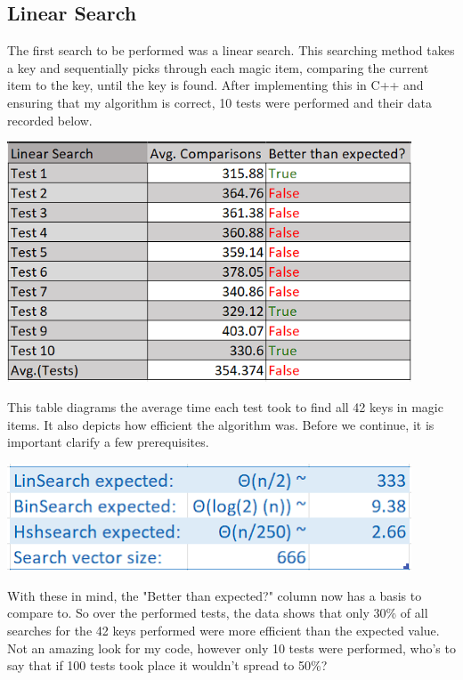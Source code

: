\documentclass[12pt, letterpaper]{article}
\begin{document}
\subsection{Linear Search} \label{LinSch}
The first search to be performed was a linear search.
This searching method takes a key and sequentially picks through each magic item, comparing the current item to the key, until the key is found.
After implementing this in C++ and ensuring that my algorithm is correct, 10 tests were performed and their data recorded below.
\begin{center}
   \includegraphics[width=120mm,scale=0.5]{LinSearch.png}
\end{center}
This table diagrams the average time each test took to find all 42 keys in magic items. 
It also depicts how efficient the algorithm was.
Before we continue, it is important clarify a few prerequisites.
\begin{center}
   \includegraphics[width=120mm,scale=0.5]{Prerequisites.png}
\end{center}
With these in mind, the "Better than expected?" column now has a basis to compare to.
So over the performed tests, the data shows that only 30\% of all searches for the 42 keys performed were more efficient than the expected value.
Not an amazing look for my code, however only 10 tests were performed, who's to say that if 100 tests took place it wouldn't spread to 50\%?
\end{document}
